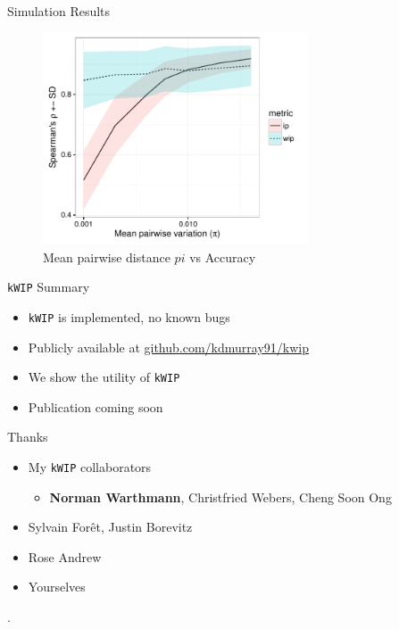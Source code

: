 \documentclass[t]{beamer}
\begin{document}
\begin{frame}{Simulation Results}
  \begin{figure}
    \centering
    \caption{Mean pairwise distance $pi$ vs Accuracy}
    \includegraphics[width=0.7\textwidth]{img/pi-vs-performance.pdf}
  \end{figure}
\end{frame}

\begin{frame}{\texttt{kWIP} Summary}
  \begin{itemize}
    \item \texttt{kWIP} is implemented, no known bugs
    \item Publicly available at \url{github.com/kdmurray91/kwip}
    \item We show the utility of \texttt{kWIP}
    \item Publication coming soon
  \end{itemize}
\end{frame}
\begin{frame}{Thanks}
  \begin{itemize}
    \item My \texttt{kWIP} collaborators
      \begin{itemize}
        \item \textbf{Norman Warthmann}, Christfried Webers, Cheng Soon Ong
      \end{itemize}
    \item Sylvain For\^{e}t, Justin Borevitz
    \item Rose Andrew
    \item Yourselves
  \end{itemize}
\end{frame}

\begin{frame}[shrink=20]{}
  \printbibliography
  \vfill
  .
\end{frame}
\end{document}
